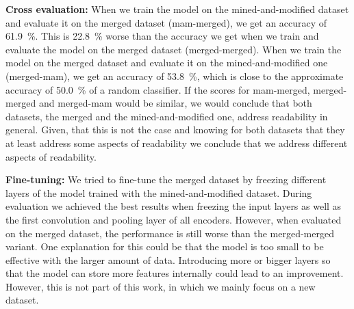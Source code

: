 \documentclass[%
class=scrreprt,
chapterprefix=false,%
open=right,%
twoside=false,%
paper=a4,%
logofile={Logo\_zentral\_farbig\_EN.png},%
thesistype=master,%
UKenglish,%
]{se2thesis}
\theoremstyle{definition}
\begin{document}
	\textbf{Cross evaluation:}
	When we train the model on the mined-and-modified dataset and evaluate it on the merged dataset (mam-merged), we get an accuracy of 61.9~\%. This is 22.8~\% worse than the accuracy we get when we train and evaluate the model on the merged dataset (merged-merged). When we train the model on the merged dataset and evaluate it on the mined-and-modified one (merged-mam), we get an accuracy of 53.8~\%, which is close to the approximate accuracy of 50.0~\% of a random classifier.
	If the scores for mam-merged, merged-merged and merged-mam would be similar, we would conclude that both datasets, the merged and the mined-and-modified one, address readability in general. Given, that this is not the case and knowing for both datasets that they at least address some aspects of readability we conclude that we address different aspects of readability.
	
	
	
	\textbf{Fine-tuning:}
	We tried to fine-tune the merged dataset by freezing different layers of the model trained with the mined-and-modified dataset. During evaluation we achieved the best results when freezing the input layers as well as the first convolution and pooling layer of all encoders. 
	However, when evaluated on the merged dataset, the performance is still worse than the merged-merged variant.
	One explanation for this could be that the model is too small to be effective with the larger amount of data. Introducing more or bigger layers so that the model can store more features internally could lead to an improvement. However, this is not part of this work, in which we mainly focus on a new dataset.
	
\end{document}
